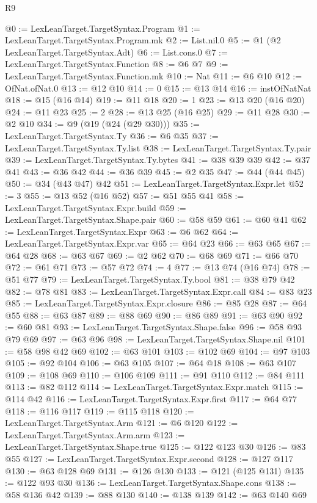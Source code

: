 \begin{lexlean}{R9}
\begin{coremodule}
@0 := LexLeanTarget.TargetSyntax.Program
@1 := LexLeanTarget.TargetSyntax.Program.mk
@2 := List.nil.{0}
@5 := @1 (@2 LexLeanTarget.TargetSyntax.Adt)
@6 := List.cons.{0}
@7 := LexLeanTarget.TargetSyntax.Function
@8 := @6 @7
@9 := LexLeanTarget.TargetSyntax.Function.mk
@10 := Nat
@11 := @6 @10
@12 := OfNat.ofNat.{0}
@13 := @12 @10
@14 := 0
@15 := @13 @14
@16 := instOfNatNat
@18 := @15 (@16 @14)
@19 := @11 @18
@20 := 1
@23 := @13 @20 (@16 @20)
@24 := @11 @23
@25 := 2
@28 := @13 @25 (@16 @25)
@29 := @11 @28
@30 := @2 @10
@34 := @9 (@19 (@24 (@29 @30)))
@35 := LexLeanTarget.TargetSyntax.Ty
@36 := @6 @35
@37 := LexLeanTarget.TargetSyntax.Ty.list
@38 := LexLeanTarget.TargetSyntax.Ty.pair
@39 := LexLeanTarget.TargetSyntax.Ty.bytes
@41 := @38 @39 @39
@42 := @37 @41
@43 := @36 @42
@44 := @36 @39
@45 := @2 @35
@47 := @44 (@44 @45)
@50 := @34 (@43 @47) @42
@51 := LexLeanTarget.TargetSyntax.Expr.let
@52 := 3
@55 := @13 @52 (@16 @52)
@57 := @51 @55 @41
@58 := LexLeanTarget.TargetSyntax.Expr.build
@59 := LexLeanTarget.TargetSyntax.Shape.pair
@60 := @58 @59
@61 := @60 @41
@62 := LexLeanTarget.TargetSyntax.Expr
@63 := @6 @62
@64 := LexLeanTarget.TargetSyntax.Expr.var
@65 := @64 @23
@66 := @63 @65
@67 := @64 @28
@68 := @63 @67
@69 := @2 @62
@70 := @68 @69
@71 := @66 @70
@72 := @61 @71
@73 := @57 @72
@74 := 4
@77 := @13 @74 (@16 @74)
@78 := @51 @77
@79 := LexLeanTarget.TargetSyntax.Ty.bool
@81 := @38 @79 @42
@82 := @78 @81
@83 := LexLeanTarget.TargetSyntax.Expr.call
@84 := @83 @23
@85 := LexLeanTarget.TargetSyntax.Expr.closure
@86 := @85 @28
@87 := @64 @55
@88 := @63 @87
@89 := @88 @69
@90 := @86 @89
@91 := @63 @90
@92 := @60 @81
@93 := LexLeanTarget.TargetSyntax.Shape.false
@96 := @58 @93 @79 @69
@97 := @63 @96
@98 := LexLeanTarget.TargetSyntax.Shape.nil
@101 := @58 @98 @42 @69
@102 := @63 @101
@103 := @102 @69
@104 := @97 @103
@105 := @92 @104
@106 := @63 @105
@107 := @64 @18
@108 := @63 @107
@109 := @108 @69
@110 := @106 @109
@111 := @91 @110
@112 := @84 @111
@113 := @82 @112
@114 := LexLeanTarget.TargetSyntax.Expr.match
@115 := @114 @42
@116 := LexLeanTarget.TargetSyntax.Expr.first
@117 := @64 @77
@118 := @116 @117
@119 := @115 @118
@120 := LexLeanTarget.TargetSyntax.Arm
@121 := @6 @120
@122 := LexLeanTarget.TargetSyntax.Arm.arm
@123 := LexLeanTarget.TargetSyntax.Shape.true
@125 := @122 @123 @30
@126 := @83 @55
@127 := LexLeanTarget.TargetSyntax.Expr.second
@128 := @127 @117
@130 := @63 @128 @69
@131 := @126 @130
@133 := @121 (@125 @131)
@135 := @122 @93 @30
@136 := LexLeanTarget.TargetSyntax.Shape.cons
@138 := @58 @136 @42
@139 := @88 @130
@140 := @138 @139
@142 := @63 @140 @69

\end{coremodule}
\end{lexlean}
